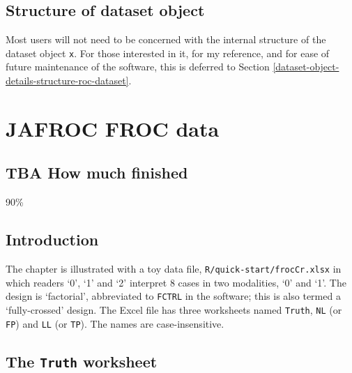 \documentclass[
]{book}
\begin{document}
\hypertarget{quick-start-roc-structure-dataset}{%
\section{Structure of dataset object}\label{quick-start-roc-structure-dataset}}

Most users will not need to be concerned with the internal structure of the dataset object \texttt{x}. For those interested in it, for my reference, and for ease of future maintenance of the software, this is deferred to Section \ref{dataset-object-details-structure-roc-dataset}.

\hypertarget{quick-start-froc-data-format}{%
\chapter{JAFROC FROC data}\label{quick-start-froc-data-format}}

\hypertarget{quick-start-froc-how-much-finished}{%
\section{TBA How much finished}\label{quick-start-froc-how-much-finished}}

90\%

\hypertarget{quick-start-froc-data-intro}{%
\section{Introduction}\label{quick-start-froc-data-intro}}

The chapter is illustrated with a toy data file, \texttt{R/quick-start/frocCr.xlsx} in which readers `0', `1' and `2' interpret 8 cases in two modalities, `0' and `1'. The design is `factorial', abbreviated to \texttt{FCTRL} in the software; this is also termed a `fully-crossed' design. The Excel file has three worksheets named \texttt{Truth}, \texttt{NL} (or \texttt{FP}) and \texttt{LL} (or \texttt{TP}). The names are case-insensitive.

\hypertarget{quick-start-froc-data-truth}{%
\section{\texorpdfstring{The \texttt{Truth} worksheet}{The Truth worksheet}}\label{quick-start-froc-data-truth}}
\end{document}
